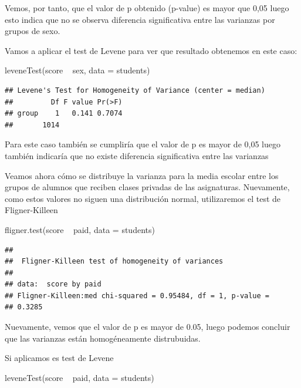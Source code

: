 \documentclass[]{article}
\newenvironment{Shaded}{\begin{snugshade}}{\end{snugshade}}
\newcommand{\DataTypeTok}[1]{\textcolor[rgb]{0.87,0.87,0.75}{#1}}
\newcommand{\KeywordTok}[1]{\textcolor[rgb]{0.94,0.87,0.69}{#1}}
\newcommand{\NormalTok}[1]{\textcolor[rgb]{0.80,0.80,0.80}{#1}}
\newcommand{\OperatorTok}[1]{\textcolor[rgb]{0.94,0.94,0.82}{#1}}
\newcommand{\StringTok}[1]{\textcolor[rgb]{0.80,0.58,0.58}{#1}}
\begin{document}
Vemos, por tanto, que el valor de p obtenido (p-value) es mayor que 0,05
luego esto indica que no se observa diferencia significativa entre las
varianzas por grupos de sexo.

Vamos a aplicar el test de Levene para ver que resultado obtenemos en
este caso:

\begin{Shaded}
\begin{Highlighting}[]
\KeywordTok{leveneTest}\NormalTok{(score }\OperatorTok{~}\StringTok{ }\NormalTok{sex, }\DataTypeTok{data =}\NormalTok{ students)}
\end{Highlighting}
\end{Shaded}

\begin{verbatim}
## Levene's Test for Homogeneity of Variance (center = median)
##         Df F value Pr(>F)
## group    1   0.141 0.7074
##       1014
\end{verbatim}

Para este caso también se cumpliría que el valor de p es mayor de 0,05
luego también indicaría que no existe diferencia significativa entre las
varianzas

Veamos ahora cómo se distribuye la varianza para la media escolar entre
los grupos de alumnos que reciben clases privadas de las asignaturas.
Nuevamente, como estos valores no siguen una distribución normal,
utilizaremos el test de Fligner-Killeen

\begin{Shaded}
\begin{Highlighting}[]
\KeywordTok{fligner.test}\NormalTok{(score }\OperatorTok{~}\StringTok{ }\NormalTok{paid, }\DataTypeTok{data =}\NormalTok{ students)}
\end{Highlighting}
\end{Shaded}

\begin{verbatim}
## 
##  Fligner-Killeen test of homogeneity of variances
## 
## data:  score by paid
## Fligner-Killeen:med chi-squared = 0.95484, df = 1, p-value =
## 0.3285
\end{verbatim}

Nuevamente, vemos que el valor de p es mayor de 0.05, luego podemos
concluir que las varianzas están homogéneamente distrubuidas.

Si aplicamos es test de Levene

\begin{Shaded}
\begin{Highlighting}[]
\KeywordTok{leveneTest}\NormalTok{(score }\OperatorTok{~}\StringTok{ }\NormalTok{paid, }\DataTypeTok{data =}\NormalTok{ students)}
\end{Highlighting}
\end{Shaded}
\end{document}

